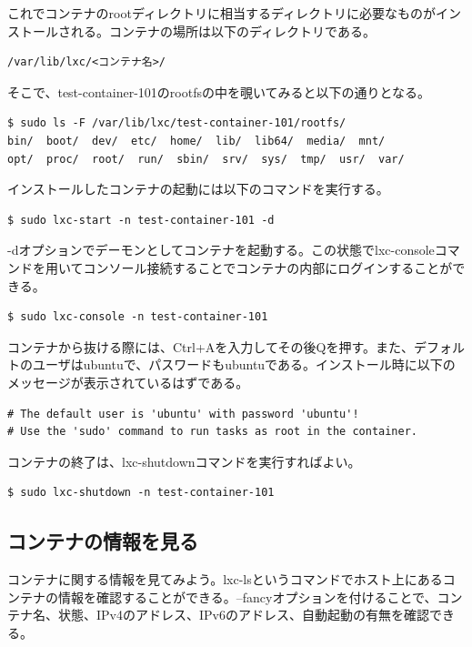 ﻿\documentclass[9pt,b5paper,tombo,openany]{jsbook}
\begin{document}
\noindent
これでコンテナのrootディレクトリに相当するディレクトリに必要なものがインストールされる。コンテナの場所は以下のディレクトリである。

\begin{lstlisting}
/var/lib/lxc/<コンテナ名>/
\end{lstlisting}

\noindent
そこで、test-container-101のrootfsの中を覗いてみると以下の通りとなる。

\begin{lstlisting}
$ sudo ls -F /var/lib/lxc/test-container-101/rootfs/
bin/  boot/  dev/  etc/  home/	lib/  lib64/  media/  mnt/
opt/  proc/  root/	run/  sbin/  srv/  sys/  tmp/  usr/  var/
\end{lstlisting}

\newpage

\noindent
インストールしたコンテナの起動には以下のコマンドを実行する。

\begin{lstlisting}
$ sudo lxc-start -n test-container-101 -d
\end{lstlisting}

\noindent
-dオプションでデーモンとしてコンテナを起動する。この状態でlxc-consoleコマンドを用いてコンソール接続することでコンテナの内部にログインすることができる。

\begin{lstlisting}
$ sudo lxc-console -n test-container-101
\end{lstlisting}

\noindent
コンテナから抜ける際には、Ctrl+Aを入力してその後Qを押す。また、デフォルトのユーザはubuntuで、パスワードもubuntuである。インストール時に以下のメッセージが表示されているはずである。

\begin{lstlisting}
# The default user is 'ubuntu' with password 'ubuntu'!
# Use the 'sudo' command to run tasks as root in the container.
\end{lstlisting}

\noindent
コンテナの終了は、lxc-shutdownコマンドを実行すればよい。

\begin{lstlisting}
$ sudo lxc-shutdown -n test-container-101
\end{lstlisting}


\subsection{コンテナの情報を見る}
コンテナに関する情報を見てみよう。lxc-lsというコマンドでホスト上にあるコンテナの情報を確認することができる。--fancyオプションを付けることで、コンテナ名、状態、IPv4のアドレス、IPv6のアドレス、自動起動の有無を確認できる。
\end{document}
